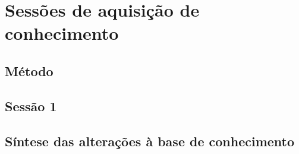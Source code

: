 \chapter{Sessões de aquisição de conhecimento}
\label{cap:sessoes}

\section{Método}


\section{Sessão 1}


\section{Síntese das alterações à base de conhecimento}


